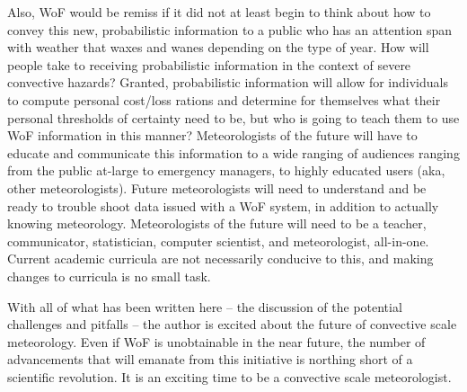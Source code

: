 Also, WoF would be remiss if it did not at least begin to think about how to convey this new, probabilistic information to a public who has an attention span with weather that waxes and wanes depending on the type of year.  How will people take to receiving probabilistic information in the context of severe convective hazards? Granted, probabilistic information will allow for individuals to compute personal cost/loss rations and determine for themselves what their personal thresholds of certainty need to be, but who is going to teach them to use WoF information in this manner? Meteorologists of the future will have to educate and communicate this information to a wide ranging of audiences ranging from the public at-large to emergency managers, to highly educated users (aka, other meteorologists). Future meteorologists will need to understand and be ready to trouble shoot data issued with a WoF system, in addition to actually knowing meteorology.  Meteorologists of the future will need to be a teacher, communicator, statistician, computer scientist, and meteorologist, all-in-one. Current academic curricula are not necessarily conducive to this, and making changes to curricula is no small task.


With all of what has been written here -- the discussion of the potential challenges and pitfalls -- the author is excited about the future of convective scale meteorology. Even if WoF is unobtainable in the near future, the number of advancements that will emanate from this initiative is northing short of a scientific revolution. It is an exciting time to be a convective scale meteorologist.